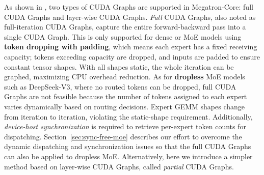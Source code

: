 \documentclass[10pt,logo,copyright]{nvidiatechreport}
\begin{document}
As shown in , two types of CUDA Graphs are supported in Megatron-Core: full CUDA Graphs and layer-wise CUDA Graphs. \textit{Full} CUDA Graphs, also noted as full-iteration CUDA Graphs, capture the entire forward-backward pass into a single CUDA Graph. This is only supported for dense or MoE models using \textbf{token dropping with padding}, which means each expert has a fixed receiving capacity; tokens exceeding capacity are dropped, and inputs are padded to ensure constant tensor shapes. With all shapes static, the whole iteration can be graphed, maximizing CPU overhead reduction. As for \textbf{dropless} MoE models such as DeepSeek-V3, where no routed tokens can be dropped, full CUDA Graphs are not feasible because the number of tokens assigned to each expert varies dynamically based on routing decisions. Expert GEMM shapes change from iteration to iteration, violating the static-shape requirement. Additionally, \textit{device-host synchronization} is required to retrieve per-expert token counts for dispatching. Section~\ref{sec:sync-free-moe} describes our effort to overcome the dynamic dispatching and synchronization issues so that the full CUDA Graphs can also be applied to dropless MoE. Alternatively, here we introduce a simpler method based on layer-wise CUDA Graphs, called \textit{partial} CUDA Graphs.

\end{document}
